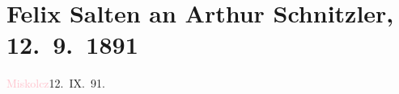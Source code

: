 

\renewcommand{\erwaehntePersonen}{Personen:  ?? [Bergdirektor],  ?? [Ingenieur], Marie Glümer, Bertha Karlsburg, Philipp Salzmann, Michael Emil Salzmann}
\renewcommand{\erwaehnteOrte}{Orte: Café Kremser, Italien, Miskolc, Opava, Ungarn, Uppony, Upponyi-szoros, Wien}
\renewcommand{\erwaehnteWerke}{}
\section[Felix Salten an Arthur Schnitzler, 12. 9. 1891]{Felix Salten an Arthur Schnitzler, 12. 9. 1891}
\nopagebreak{}
\rehead{ }\normalsize\beginnumbering{}
\toendnotes[C]{\smallbreak\pagebreak[2]}
\toendnotes[C]{\smallbreak}
\pstart
           \centering{}{\pb}\textcolor{pink}{Miskolcz}{}\ledrightnote{\textcolor{pink}{Miskolc}}{ }12. IX. 91.\pend
           
